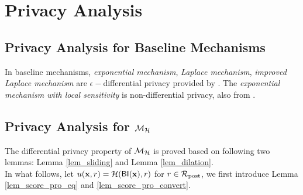 \documentclass{article}
\begin{document}


\section{Privacy Analysis}

\subsection{Privacy Analysis for Baseline Mechanisms}
In baseline mechanisms, \emph{exponential mechanism}, \emph{Laplace mechanism}, \emph{improved Laplace mechanism} are $\epsilon-$differential privacy provided by \cite{dwork2014algorithmic}. The \emph{exponential mechanism with local sensitivity} is non-differential privacy, also from \cite{dwork2014algorithmic}.

\subsection{Privacy Analysis for $\mathcal{M}_{\mathcal{H}}$}

The differential privacy property of $\mathcal{M}_{\mathcal{H}}$ is proved based on following two lemmas: Lemma \ref{lem_sliding} and Lemma \ref{lem_dilation}.\\


In what follows, let $ u(\textbf{x}, {r}) = \mathcal{H}(\mathsf{BI}(\textbf{x}), r)$ for $r \in \mathcal{R}_{\textup{post}}$, we first introduce Lemma \ref{lem_score_pro_eq} and \ref{lem_score_pro_convert}.
\end{document}
